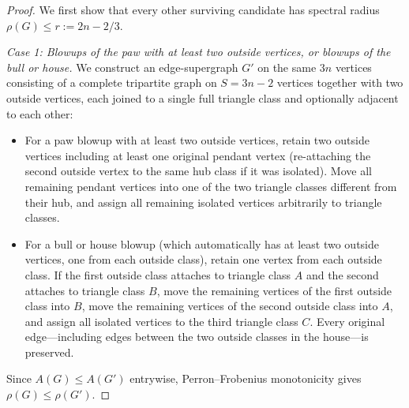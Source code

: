 \documentclass[10pt]{article}
\begin{document}
\begin{proof}
We first show that every other surviving candidate has spectral radius $\rho(G) \leq r := 2n - 2/3$.

\emph{Case 1: Blowups of the paw with at least two outside vertices, or blowups of the bull or house.}
We construct an edge-supergraph $G'$ on the same $3n$ vertices consisting of a complete tripartite graph on $S = 3n - 2$ vertices together with two outside vertices, each joined to a single full triangle class and optionally adjacent to each other:
\begin{itemize}
\item For a paw blowup with at least two outside vertices, retain two outside vertices including at least one original pendant vertex (re-attaching the second outside vertex to the same hub class if it was isolated). Move all remaining pendant vertices into one of the two triangle classes different from their hub, and assign all remaining isolated vertices arbitrarily to triangle classes.
\item For a bull or house blowup (which automatically has at least two outside vertices, one from each outside class), retain one vertex from each outside class. If the first outside class attaches to triangle class $A$ and the second attaches to triangle class $B$, move the remaining vertices of the first outside class into $B$, move the remaining vertices of the second outside class into $A$, and assign all isolated vertices to the third triangle class $C$. Every original edge---including edges between the two outside classes in the house---is preserved.
\end{itemize}
Since $A(G) \leq A(G')$ entrywise, Perron--Frobenius monotonicity gives $\rho(G) \leq \rho(G')$.


\end{proof}
\end{document}
